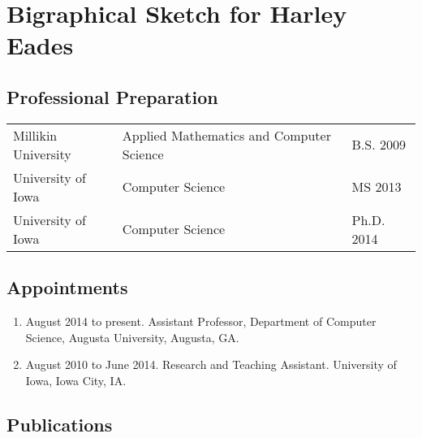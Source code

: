 \section*{Bigraphical Sketch for Harley Eades}

\subsection*{Professional Preparation}


\begin{tabular}{lll}
  Millikin University  & Applied Mathematics and Computer Science   & B.S. 2009  \\
  University of Iowa   & Computer Science   & MS 2013 \\  
  University of Iowa   & Computer Science   & Ph.D. 2014 \\
\end{tabular}

\subsection*{Appointments}

\begin{enumerate}\itemsep 0pt
\item August 2014 to present.  Assistant Professor, Department of
  Computer Science, Augusta University, Augusta, GA.

\item August 2010 to June 2014. Research and
  Teaching Assistant. University of Iowa, Iowa City, IA.
\end{enumerate}


\subsection*{Publications}


